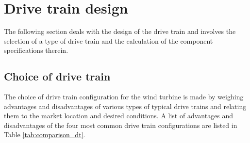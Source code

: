 \section{Drive train design}

The following section deals with the design of the drive train and involves the selection of a type of drive train and the calculation of the component specifications therein.

\subsection{Choice of drive train}

The choice of drive train configuration for the wind turbine is made by weighing advantages and disadvantages of various types of typical drive trains and relating them to the market location and desired conditions. A list of advantages and disadvantages of the four most common drive train configurations are listed in Table \ref{tab:comparison_dt}. 

